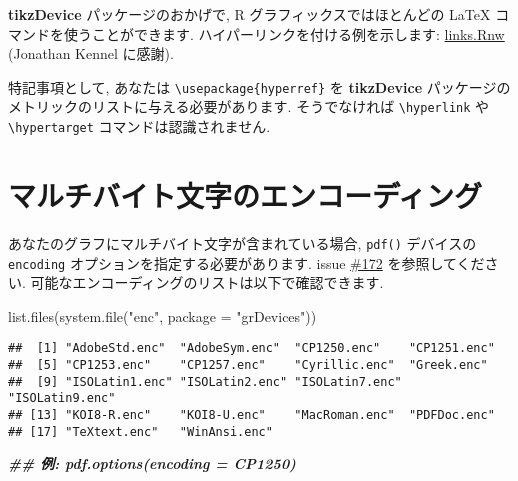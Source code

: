 \documentclass[
  lualatex,ja=standard,jafont=noto-otf]{bxjsreport}
\newenvironment{Shaded}{\begin{snugshade}}{\end{snugshade}}
\newcommand{\AttributeTok}[1]{\textcolor[rgb]{0.77,0.63,0.00}{#1}}
\newcommand{\DocumentationTok}[1]{\textcolor[rgb]{0.56,0.35,0.01}{\textbf{\textit{#1}}}}
\newcommand{\FunctionTok}[1]{\textcolor[rgb]{0.00,0.00,0.00}{#1}}
\newcommand{\NormalTok}[1]{#1}
\newcommand{\StringTok}[1]{\textcolor[rgb]{0.31,0.60,0.02}{#1}}
\begin{document}
\textbf{tikzDevice} パッケージのおかげで, R グラフィックスではほとんどの
LaTeX コマンドを使うことができます. ハイパーリンクを付ける例を示します:
\href{https://gist.github.com/1937313}{links.Rnw} (Jonathan Kennel
に感謝).

特記事項として, あなたは \texttt{\textbackslash{}usepackage\{hyperref\}}
を \textbf{tikzDevice}
パッケージのメトリックのリストに与える必要があります. そうでなければ
\texttt{\textbackslash{}hyperlink} や
\texttt{\textbackslash{}hypertarget} コマンドは認識されません.

\hypertarget{ux30deux30ebux30c1ux30d0ux30a4ux30c8ux6587ux5b57ux306eux30a8ux30f3ux30b3ux30fcux30c7ux30a3ux30f3ux30b0}{%
\section*{マルチバイト文字のエンコーディング}\label{ux30deux30ebux30c1ux30d0ux30a4ux30c8ux6587ux5b57ux306eux30a8ux30f3ux30b3ux30fcux30c7ux30a3ux30f3ux30b0}}

あなたのグラフにマルチバイト文字が含まれている場合, \texttt{pdf()}
デバイスの \texttt{encoding} オプションを指定する必要があります. issue
\href{https://github.com/yihui/knitr/issues/172}{\#172}
を参照してください. 可能なエンコーディングのリストは以下で確認できます.

\begin{Shaded}
\begin{Highlighting}[numbers=left,,]
\FunctionTok{list.files}\NormalTok{(}\FunctionTok{system.file}\NormalTok{(}\StringTok{"enc"}\NormalTok{, }\AttributeTok{package =} \StringTok{"grDevices"}\NormalTok{))}
\end{Highlighting}
\end{Shaded}

\begin{verbatim}
##  [1] "AdobeStd.enc"  "AdobeSym.enc"  "CP1250.enc"    "CP1251.enc"   
##  [5] "CP1253.enc"    "CP1257.enc"    "Cyrillic.enc"  "Greek.enc"    
##  [9] "ISOLatin1.enc" "ISOLatin2.enc" "ISOLatin7.enc" "ISOLatin9.enc"
## [13] "KOI8-R.enc"    "KOI8-U.enc"    "MacRoman.enc"  "PDFDoc.enc"   
## [17] "TeXtext.enc"   "WinAnsi.enc"
\end{verbatim}

\begin{Shaded}
\begin{Highlighting}[numbers=left,,]
\DocumentationTok{\#\# 例: pdf.options(encoding = \textquotesingle{}CP1250\textquotesingle{})}
\end{Highlighting}
\end{Shaded}
\end{document}
